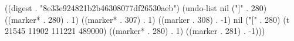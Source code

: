 
((digest . "8e33e924821b2b46308077df26530aeb") (undo-list nil ("]" . 280) ((marker* . 280) . 1) ((marker* . 307) . 1) ((marker . 308) . -1) nil ("[" . 280) (t 21545 11902 111221 489000) ((marker* . 280) . 1) ((marker . 281) . -1)))
